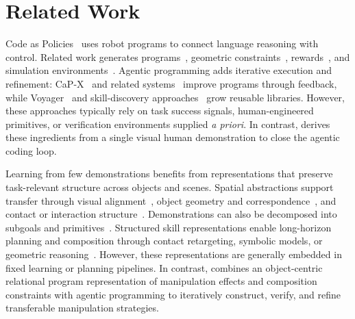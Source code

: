 \section{Related Work}

Code as Policies~\cite{liang2023code} uses robot programs to connect language reasoning with control. Related work generates programs~\cite{singh2023progprompt,wang2025chainofmodality}, geometric constraints~\cite{huang2023voxposer,huang2024rekep}, rewards~\cite{ma2024eureka,xie2024text2reward}, and simulation environments~\cite{wang2024robogen}. Agentic programming adds iterative execution and refinement: CaP-X~\cite{fu2026cap} and related systems~\cite{xiao2026enpire,noematrix2026roborsi,chen2026gap,li2026roboclaw} improve programs through feedback, while Voyager~\cite{wang2023voyager} and skill-discovery approaches~\cite{lu2026aspire,zhang2026playful} grow reusable libraries. However, these approaches typically rely on task success signals, human-engineered primitives, or verification environments supplied \textit{a priori}. In contrast, \ours derives these ingredients from a single visual human demonstration to close the agentic coding loop.

Learning from few demonstrations benefits from representations that preserve task-relevant structure across objects and scenes. Spatial abstractions support transfer through visual alignment~\cite{johns2021coarsetofine}, object geometry and correspondence~\cite{wen2022you,simeonov2022neural,shen2023distilled,zhu2024densematcher}, and contact or interaction structure~\cite{biza2023one,liu2025oneshot,sieb19graph,zhu2024orion}. Demonstrations can also be decomposed into subgoals and primitives~\cite{zhang2024universal,gao2024prime}. Structured skill representations enable long-horizon planning and composition through contact retargeting, symbolic models, or geometric reasoning~\cite{wu2024oneshot,liu2024learning,cheng2024nodtamp,nie2026learning,zandonati2025rational}. However, these representations are generally embedded in fixed learning or planning pipelines. In contrast, \ours combines an object-centric relational program representation of manipulation effects and composition constraints with agentic programming to iteratively construct, verify, and refine transferable manipulation strategies.


